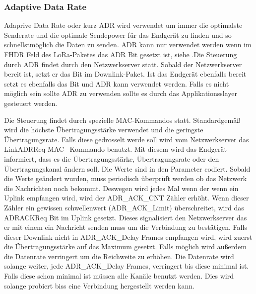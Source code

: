 \documentclass[a4paper,12pt]{article}
\begin{document}

            \subsubsection{Adaptive Data Rate}\label{sec:ADR}
            Adaprive Data Rate oder kurz ADR wird verwendet um immer die optimalste Senderate und die optimale 
            Sendepower für das Endgerät zu finden und so schnellstmöglich die Daten zu senden. ADR kann nur 
            verwendet werden wenn im FHDR Feld des LoRa-Paketes das ADR Bit gesetzt ist, siehe 
            .Die Steuerung durch ADR findet durch den Netzwerkserver statt. Sobald der 
            Netzwerkserver bereit ist, setzt er das Bit im Downlink-Paket. Ist das Endgerät ebenfalls bereit 
            setzt es ebenfalls das Bit und ADR kann verwendet werden. Falls es nicht möglich sein sollte ADR zu 
            verwenden sollte es durch das Applikationsslayer gesteuert werden.

            Die Steuerung findet durch spezielle MAC-Kommandos statt. Standardgemäß wird die höchste 
            Übertragungsstärke verwendet und die geringste Übertragungsrate. Falls diese gedrosselt werde soll 
            wird vom Netzwerkserver das LinkADRReq MAC –Kommando benutzt. Mit diesem wird das Endgerät informiert, 
            dass es die Übertragungsstärke, Übertragungsrate oder den Übertragungskanal ändern soll. Die Werte sind 
            in den Parameter codiert. Sobald die Werte geändert wurden, muss periodisch überprüft werden ob das 
            Netzwerk die Nachrichten noch bekommt. Deswegen wird jedes Mal wenn der wenn ein Uplink empfangen wird, 
            wird der ADR\_ACK\_CNT Zähler erhöht. Wenn dieser Zähler ein gewissen schwellenwert (ADR\_ACK\_Limit) 
            überschreitet, wird das ADRACKReq Bit im Uplink gesetzt. Dieses signalisiert den Netzwerkserver das er 
            mit einem ein Nachricht senden muss um die Verbindung zu bestätigen. Falls dieser Downlink nicht in 
            ADR\_ACK\_Delay Frames empfangen wird, wird zuerst die Übertragungsstärke auf das Maximum gesetzt. 
            Falls möglich wird außerdem die Datenrate verringert um die Reichweite zu erhöhen. Die Datenrate wird 
            solange weiter, jede ADR\_ACK\_Delay Frames, verringert bis diese minimal ist. Falls diese schon 
            minimal ist müssen alle Kanäle benutzt werden. Dies wird solange probiert biss eine Verbindung 
            hergestellt werden kann. \cite[S.19 f]{LoRaSpec}         
\end{document}

